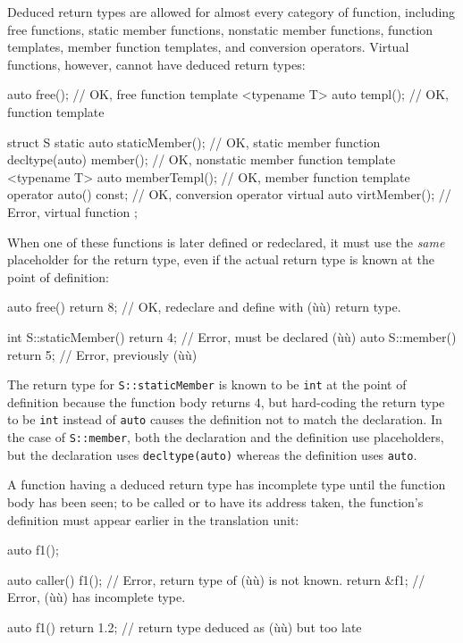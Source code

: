 Deduced return types are allowed for almost every category of function,
including free functions, static member functions, nonstatic member
functions, function templates, member function templates, and conversion
operators. Virtual functions, however, cannot have deduced return types:

\begin{emcppslisting}
auto free();                                   // OK, free function
template <typename T> auto templ();            // OK, function template

struct S
{
    static auto staticMember();                // OK, static member function
    decltype(auto) member();                   // OK, nonstatic member function
    template <typename T> auto memberTempl();  // OK, member function template
    operator auto() const;                     // OK, conversion operator
    virtual auto virtMember();                 // Error, virtual function
};
\end{emcppslisting}
    

\noindent When one of these functions is later defined or redeclared, it must use
the \emph{same} placeholder for the return type, even if the actual
return type is known at the point of definition:

\begin{emcppslisting}
auto free() { return 8; }  // OK, redeclare and define with (ù{}ù) return type.

int S::staticMember() { return 4; }  // Error, must be declared (ù{}ù)
auto S::member() { return 5; }       // Error, previously (ù{}ù)
\end{emcppslisting}
    

\noindent The return type for \lstinline!S::staticMember! is known to be \lstinline!int!
at the point of definition because the function body returns
4, but hard-coding the return type to be \lstinline!int! instead of
\lstinline!auto! causes the definition not to match the declaration. In the
case of \lstinline!S::member!, both the declaration and the definition use
placeholders, but the declaration uses \lstinline!decltype(auto)! whereas
the definition uses \lstinline!auto!.

A function having a deduced return type has incomplete type until the
function body has been seen; to be called or to have its address taken,
the function's definition must appear earlier in the translation unit:

\begin{emcppslisting}
auto f1();

auto caller()
{
    f1();       // Error, return type of (ù{}ù) is not known.
    return &f1; // Error, (ù{}ù) has incomplete type.
}

auto f1() { return 1.2; }  // return type deduced as (ù{}ù) but too late
\end{emcppslisting}
    

